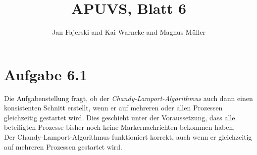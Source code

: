 \documentclass[a4paper,
12pt,
BCOR12mm,
]{scrartcl}
\title{APUVS, Blatt 6}
\author{Jan Fajerski and Kai Warncke and Magnus Müller}
\theoremstyle{break}
\begin{document}

\maketitle 

\section*{Aufgabe 6.1}
Die Aufgabenstellung fragt, ob der \emph{Chandy-Lamport-Algorithmus} auch dann einen
konsistenten Schnitt erstellt, wenn er auf mehreren oder allen Prozessen gleichzeitig
gestartet wird. Dies geschieht unter der Voraussetzung, dass alle beteiligten Prozesse
bisher noch keine Markernachrichten bekommen haben. \\

Der Chandy-Lamport-Algorithmus funktioniert korrekt, auch wenn er gleichzeitig auf
mehreren Prozessen gestartet wird. \\
\end{document}
